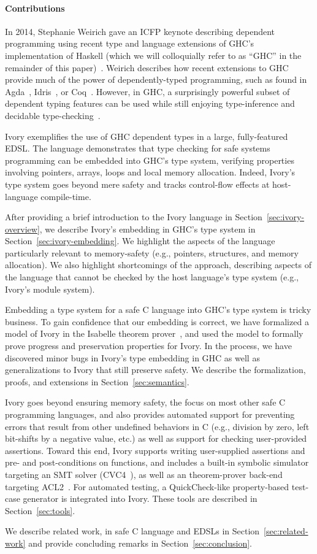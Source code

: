 \paragraph{Contributions}
In 2014, Stephanie Weirich gave an ICFP keynote describing dependent programming
using recent type and language extensions of GHC's implementation of Haskell
(which we will colloquially refer to as ``GHC'' in the remainder of this
paper)~\cite{weirich-keynote}. Weirich describes how recent extensions to GHC
provide much of the power of dependently-typed programming, such as found in
Agda~\cite{agda}, Idris~\cite{idris}, or Coq~\cite{coq}. However, in GHC, a
surprisingly powerful subset of dependent typing features can be used while
still enjoying type-inference and decidable type-checking~\cite{dephaskell}.

Ivory exemplifies the use of GHC dependent types in a large, fully-featured
EDSL. The language demonstrates that type checking for safe systems programming
can be embedded into GHC's type system, verifying properties involving
pointers, arrays, loops and local memory allocation. Indeed, Ivory's type
system goes beyond mere safety and tracks control-flow effects at host-language
compile-time.

After providing a brief introduction to the Ivory language in
Section~\ref{sec:ivory-overview}, we describe Ivory's embedding in GHC's type
system in Section~\ref{sec:ivory-embedding}. We highlight the aspects of the
language particularly relevant to memory-safety (e.g., pointers, structures, and
memory allocation). We also highlight shortcomings of the approach, describing
aspects of the language that cannot be checked by the host language's type
system (e.g., Ivory's module system).

Embedding a type system for a safe C language into GHC's type system is tricky
business. To gain confidence that our embedding is correct, we have formalized a
model of Ivory in the Isabelle theorem prover~\cite{isabelle}, and used the model to
formally prove progress and preservation properties for Ivory. In the process,
we have discovered minor bugs in Ivory's type embedding in GHC as well as
generalizations to Ivory that still preserve safety. We describe the
formalization, proofs, and extensions in Section~\ref{sec:semantics}.

Ivory goes beyond ensuring memory safety, the focus on most other safe C
programming languages, and also provides automated support for preventing errors
that result from other undefined behaviors in C (e.g., division by zero, left
bit-shifts by a negative value, etc.) as well as support for checking
user-provided assertions. Toward this end, Ivory supports writing user-supplied
assertions and pre- and post-conditions on functions, and includes a built-in
symbolic simulator targeting an SMT solver (CVC4~\cite{cvc4}), as well as an
theorem-prover back-end targeting ACL2~\cite{acl2}. For automated testing, a
QuickCheck-like property-based test-case generator is integrated into
Ivory. These tools are described in Section~\ref{sec:tools}.

We describe related work, in safe C language and EDSLs in
Section~\ref{sec:related-work} and provide concluding remarks in
Section~\ref{sec:conclusion}.

